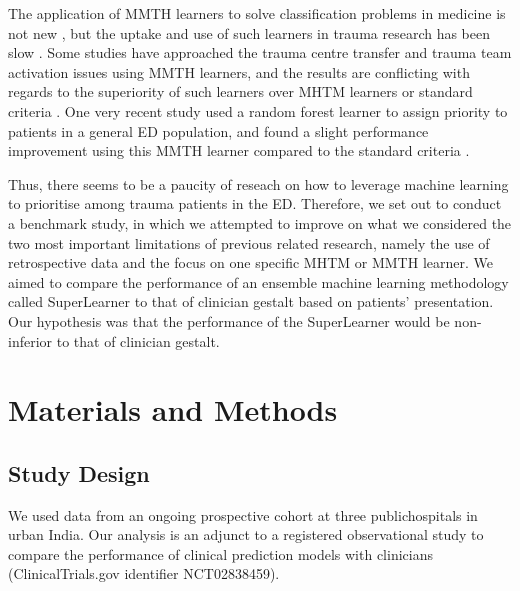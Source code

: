 \documentclass[10pt,letterpaper]{article}\usepackage[]{graphicx}\usepackage[]{color}
\begin{document}
The application of MMTH learners to solve classification problems in medicine is
not new \cite{Nevin2018}, but the uptake and use of such learners in trauma
research has been slow \cite{Liu2017}. Some studies have approached the trauma
centre transfer and trauma team activation issues using MMTH learners, and the
results are conflicting with regards to the superiority of such learners over
MHTM learners or standard criteria
\cite{Talbert2007,Pearl2008,Scerbo2014,Follin2016}. One very recent study used a
random forest learner to assign priority to patients in a general ED population,
and found a slight performance improvement using this MMTH learner compared to
the standard criteria \cite{Levin2018}.

Thus, there seems to be a paucity of reseach on how to leverage machine learning
to prioritise among trauma patients in the ED. Therefore, we set out to conduct
a benchmark study, in which we attempted to improve on what we considered the
two most important limitations of previous related research, namely the use of
retrospective data and the focus on one specific MHTM or MMTH learner. We aimed
to compare the performance of an ensemble machine learning methodology called
SuperLearner to that of clinician gestalt based on patients’ presentation. Our
hypothesis was that the performance of the SuperLearner would be non-inferior to
that of clinician gestalt.

\section*{Materials and Methods}
\subsection*{Study Design}
We used data from an ongoing prospective cohort at three publichospitals in
urban India. Our analysis is an adjunct to a registered observational study to
compare the performance of clinical prediction models with clinicians
(ClinicalTrials.gov identifier NCT02838459).

\end{document}
